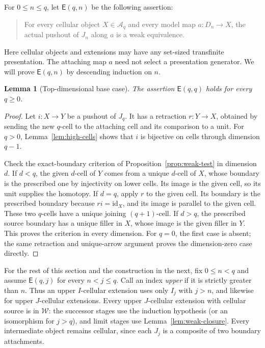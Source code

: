 \documentclass[11pt,letterpaper]{article}
\numberwithin{equation}{section}
\theoremstyle{plain}
\newtheorem{lemma}[theorem]{Lemma}
\theoremstyle{definition}
\theoremstyle{remark}
\begin{document}
For $0\leq n\leq q$, let $\mathsf E(q,n)$ be the following assertion:
\begin{quote}
For every cellular object $X\in\mathcal A_q$ and every model map
$a:D_n\to X$, the actual pushout of $J_n$ along $a$ is a weak
equivalence.
\end{quote}
Here cellular objects and extensions may have any set-sized
transfinite presentation.  The attaching map $a$ need not select
a presentation generator.  We will prove $\mathsf E(q,n)$ by
descending induction on $n$.

\begin{lemma}[Top-dimensional base case]\label{lem:cutoff-base}
The assertion $\mathsf E(q,q)$ holds for every $q\geq0$.
\end{lemma}

\begin{proof}
Let $i:X\to Y$ be a pushout of $J_q$.  It has a retraction
$r:Y\to X$, obtained by sending the new $q$-cell to the attaching
cell and its comparison to a unit.  For $q>0$,
Lemma~\ref{lem:high-cells} shows that $i$ is bijective on cells
through dimension $q-1$.

Check the exact-boundary criterion of
Proposition~\ref{prop:weak-test} in dimension $d$.  If $d<q$, the
given $d$-cell of $Y$ comes from a unique $d$-cell of $X$, whose
boundary is the prescribed one by injectivity on lower cells.
Its image is the given cell, so its unit supplies the homotopy.
If $d=q$, apply $r$ to the given cell.  Its boundary is the
prescribed boundary because $ri=\mathrm{id}_X$, and its image is parallel
to the given cell.  These two $q$-cells have a unique joining
$(q+1)$-cell.  If $d>q$, the prescribed source boundary has a
unique filler in $X$, whose image is the given filler in $Y$.
This proves the criterion in every dimension.
For $q=0$, the first case is absent; the same retraction and
unique-arrow argument proves the dimension-zero case directly.
\end{proof}

For the rest of this section and the construction in the next,
fix $0\leq n<q$ and assume $\mathsf E(q,j)$ for every
$n<j\leq q$.  Call an index \emph{upper} if it is strictly greater
than $n$.  Thus an upper $I$-cellular extension uses only $I_j$
with $j>n$, and likewise for upper $J$-cellular extensions.
Every upper $J$-cellular extension with cellular source is in
$\mathcal W$: the successor stages use the induction hypothesis
(or an isomorphism for $j>q$), and limit stages use
Lemma~\ref{lem:weak-closure}.  Every intermediate object remains
cellular, since each $J_j$ is a composite of two boundary
attachments.
\end{document}
